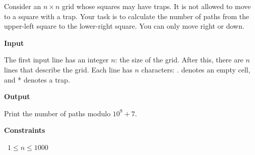 Consider an $n \times n$ grid whose squares may have traps. It is not allowed to move to a square with a trap.
Your task is to calculate the number of paths from the upper-left square to the lower-right square. You can only move right or down.

\vspace{0.3cm}\noindent\textbf{Input}

The first input line has an integer $n$: the size of the grid.
After this, there are $n$ lines that describe the grid. Each line has $n$ characters: . denotes an empty cell, and * denotes a trap.

\vspace{0.3cm}\noindent\textbf{Output}

Print the number of paths modulo $10^9+7$.

\vspace{0.3cm}\noindent\textbf{Constraints}

\textbullet\ $1 \le n \le 1000$